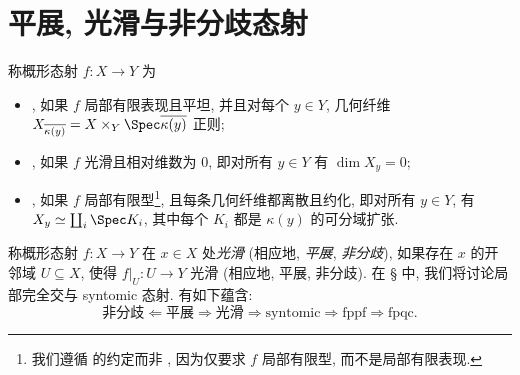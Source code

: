 \section{平展, 光滑与非分歧态射}\label{src:A.3}
称概形态射 $f:X\to Y$ 为
\begin{itemize}
\item {}, 如果 $f$ 局部有限表现且平坦, 并且对每个 $y\in Y$, 几何纤维 $X_{\overline{\kappa(y)}}=X\times_Y\Spec\overline{\kappa(y)}$ 正则;
\item {}, 如果 $f$ 光滑且相对维数为 $0$, 即对所有 $y\in Y$ 有 $\dim X_y=0$;
\item {}, 如果 $f$ 局部有限型\footnote{我们遵循 \cite{GR71,SP} 的约定而非 \cite{EGA}, 因为仅要求 $f$ 局部有限型, 而不是局部有限表现.}, 且每条几何纤维都离散且约化, 即对所有 $y\in Y$, 有 $X_y\simeq\coprod_i\Spec K_i$, 其中每个 $K_i$ 都是 $\kappa(y)$ 的可分域扩张.
\end{itemize}
称概形态射 $f:X\to Y$ 在 $x\in X$ 处\textit{光滑} (相应地, \textit{平展}, \textit{非分歧}), 如果存在 $x$ 的开邻域 $U\subseteq X$, 使得 $f|_U:U\to Y$ 光滑 (相应地, 平展, 非分歧). 在 \S{} 中, 我们将讨论局部完全交与 syntomic 态射. 有如下蕴含:
\[
\text{非分歧}\Longleftarrow\text{平展}\Longrightarrow\text{光滑}\Longrightarrow\text{syntomic}\Longrightarrow\text{fppf}\Longrightarrow\text{fpqc}.
\]

